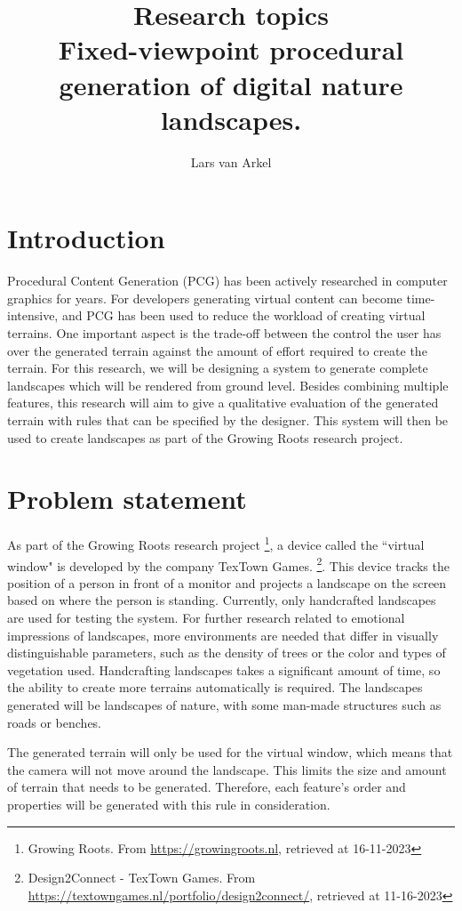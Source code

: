 \documentclass{article}
\title{Research topics\\Fixed-viewpoint procedural generation of digital nature landscapes.}
\author{Lars van Arkel}
\begin{document}
 
\maketitle

\section{Introduction}
Procedural Content Generation (PCG) has been actively researched in computer graphics for years. For developers generating virtual content can become time-intensive, and PCG has been used to reduce the workload of creating virtual terrains. One important aspect is the trade-off between the control the user has over the generated terrain against the amount of effort required to create the terrain. For this research, we will be designing a system to generate complete landscapes which will be rendered from ground level. Besides combining multiple features, this research will aim to give a qualitative evaluation of the generated terrain with rules that can be specified by the designer. This system will then be used to create landscapes as part of the Growing Roots research project.

\section{Problem statement}
As part of the Growing Roots research project \footnote{Growing Roots. From \url{https://growingroots.nl}, retrieved at 16-11-2023}, a device called the ``virtual window" is developed by the company TexTown Games. \footnote{Design2Connect - TexTown Games. From \url{https://textowngames.nl/portfolio/design2connect/}, retrieved at 11-16-2023}. This device tracks the position of a person in front of a monitor and projects a landscape on the screen based on where the person is standing. Currently, only handcrafted landscapes are used for testing the system. For further research related to emotional impressions of landscapes, more environments are needed that differ in visually distinguishable parameters, such as the density of trees or the color and types of vegetation used. Handcrafting landscapes takes a significant amount of time, so the ability to create more terrains automatically is required. The landscapes generated will be landscapes of nature, with some man-made structures such as roads or benches. 

The generated terrain will only be used for the virtual window, which means that the camera will not move around the landscape. This limits the size and amount of terrain that needs to be generated. Therefore, each feature's order and properties will be generated with this rule in consideration.
\end{document}
